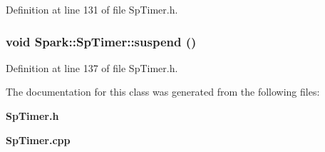 Definition at line 131 of file Sp\-Timer.h.
\subsubsection{\setlength{\rightskip}{0pt plus 5cm}void Spark::Sp\-Timer::suspend ()\hspace{0.3cm}{\tt  [inline]}}\label{classSpark_1_1SpTimer_a4}


Definition at line 137 of file Sp\-Timer.h.

The documentation for this class was generated from the following files:\begin{CompactItemize}
\item 
{\bf Sp\-Timer.h}\item 
{\bf Sp\-Timer.cpp}\end{CompactItemize}
